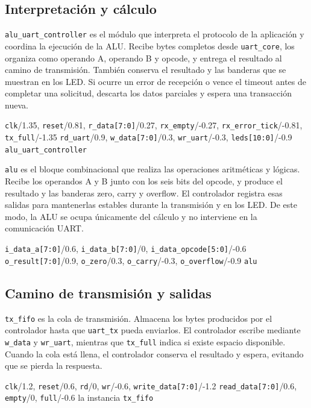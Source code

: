 \subsection{Interpretación y cálculo}

\texttt{alu\_uart\_controller} es el módulo que interpreta el protocolo de la
aplicación y coordina la ejecución de la ALU. Recibe bytes completos desde
\texttt{uart\_core}, los organiza como operando A, operando B y
opcode, y entrega
el resultado al camino de transmisión. También conserva el resultado y las
banderas que se muestran en los LED. Si ocurre un error de recepción o vence el
timeout antes de completar una solicitud, descarta los datos parciales y espera
una transacción nueva.

{{\texttt{clk}}/1.35,
  {\texttt{reset}}/0.81,
  {\texttt{r\_data[7:0]}}/0.27,
  {\texttt{rx\_empty}}/-0.27,
  {\texttt{rx\_error\_tick}}/-0.81,
{\texttt{tx\_full}}/-1.35}
{{\texttt{rd\_uart}}/0.9,
  {\texttt{w\_data[7:0]}}/0.3,
  {\texttt{wr\_uart}}/-0.3,
{\texttt{leds[10:0]}}/-0.9}
{\texttt{alu\_uart\_controller}}

\texttt{alu} es el bloque combinacional que realiza las operaciones aritméticas
y lógicas. Recibe los operandos A y B junto con los seis bits del opcode, y
produce el resultado y las banderas zero, carry y overflow. El controlador
registra esas salidas para mantenerlas estables durante la transmisión y en los
LED. De este modo, la ALU se ocupa únicamente del cálculo y no interviene en la
comunicación UART.

{{\texttt{i\_data\_a[7:0]}}/0.6,
  {\texttt{i\_data\_b[7:0]}}/0,
{\texttt{i\_data\_opcode[5:0]}}/-0.6}
{{\texttt{o\_result[7:0]}}/0.9,
  {\texttt{o\_zero}}/0.3,
  {\texttt{o\_carry}}/-0.3,
{\texttt{o\_overflow}}/-0.9}
{\texttt{alu}}

\subsection{Camino de transmisión y salidas}

\texttt{tx\_fifo} es la cola de transmisión. Almacena los bytes producidos por
el controlador hasta que \texttt{uart\_tx} pueda enviarlos. El controlador
escribe mediante \texttt{w\_data} y \texttt{wr\_uart}, mientras que
\texttt{tx\_full} indica si existe espacio disponible. Cuando la cola está
llena, el controlador conserva el resultado y espera, evitando que se pierda la
respuesta.

{{\texttt{clk}}/1.2,
  {\texttt{reset}}/0.6,
  {\texttt{rd}}/0,
  {\texttt{wr}}/-0.6,
{\texttt{write\_data[7:0]}}/-1.2}
{{\texttt{read\_data[7:0]}}/0.6,
  {\texttt{empty}}/0,
{\texttt{full}}/-0.6}
{la instancia \texttt{tx\_fifo}}

